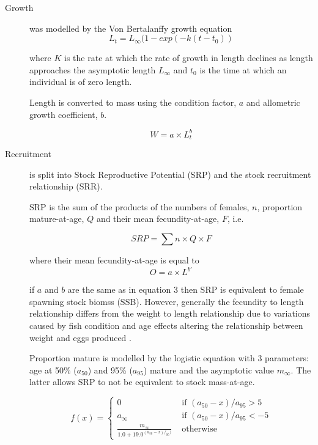 \documentclass[%
nonumbib,      %
%
]{nrc1}                          %
\begin{document}
\begin{description}
    \item[Growth] was modelled by the Von Bertalanffy growth equation \cite{von1957quantitative}
      \begin{equation} L_t = L_{\infty}(1 - exp(-k(t-t_0)) \end{equation}
         
where $K$ is the rate at which the rate of growth in length declines as length approaches the asymptotic length  $L_{\infty}$ 
and $t_{0}$ is the time at which an individual is of zero length. 

Length is converted to mass using the condition factor, $a$ and allometric growth coefficient, $b$.

\begin{equation} W = a \times L_t^b \end{equation}

 \item[Recruitment] is split into Stock Reproductive Potential (SRP) and the stock recruitment relationship (SRR).

SRP is the sum of the products of the numbers of females, $n$, proportion mature-at-age, $Q$ and their mean fecundity-at-age, $F$, i.e. 

   \begin{equation} SRP = \sum{n \times Q \times F } \end{equation}

where their mean fecundity-at-age is equal to 
\begin{equation} O	 = a \times L^{b\prime} \end{equation}

if $a$ and $b$ are the same as in equation 3 then SRP is equivalent to female spawning stock biomss (SSB). However, generally the 
fecundity to length relationship differs from the weight to length relationship due to variations caused by fish condition and age 
effects altering the relationship between weight and eggs produced \cite{perez2012study}.

Proportion mature is modelled by the logistic equation with 3 parameters: age at 50\% ($a_{50}$) and 95\% ($a_{95}$) mature and the asymptotic value $m_{\infty}$. The 
latter allows SRP to not be equivalent to stock mass-at-age.

\begin{equation}
f(x) = \left\{ \begin{array}{ll}
			0                                 &\mbox{ if $(a_{50}-x)/a_{95} >  5$} \\
			a_{\infty}                        &\mbox{ if $(a_{50}-x)/a_{95} < -5$} \\
			\frac{m_{\infty}}{1.0+19.0^{(a_{50}-x)/_{95})}} &\mbox{ otherwise}
		\end{array}
       \right.
\end{equation}


\end{description}
\end{document}
